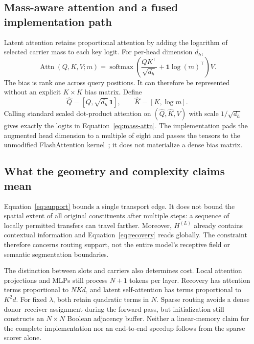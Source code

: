 \subsection{Mass-aware attention and a fused implementation path}

Latent attention retains proportional attention by adding the logarithm of
selected carrier mass to each key logit. For per-head dimension $d_h$,
\begin{equation}
 \operatorname{Attn}(Q,K,V;m)=
 \operatorname{softmax}\!\left(\frac{QK^\top}{\sqrt {d_h}}
 +\mathbf 1\log(m)^\top\right)V.
 \label{eq:mass-attn}
\end{equation}
The bias is rank one across query positions. It can therefore be represented
without an explicit $K\times K$ bias matrix. Define
\begin{equation}
\widehat Q=[Q,\sqrt {d_h}\,\mathbf 1],\qquad
 \widehat K=[K,\log m].
\end{equation}
Calling standard scaled dot-product attention on $(\widehat Q,\widehat K,V)$
with scale $1/\sqrt {d_h}$ gives exactly the logits in
Equation~\eqref{eq:mass-attn}. The implementation pads the augmented head
dimension to a multiple of eight and passes the tensors to the unmodified
FlashAttention kernel~\cite{flashattn2022}; it does not materialize a dense
bias matrix.

\subsection{What the geometry and complexity claims mean}

Equation~\eqref{eq:support} bounds a single transport edge. It does not bound
the spatial extent of all original constituents after multiple steps: a
sequence of locally permitted transfers can travel farther. Moreover,
$H^{(L)}$ already contains contextual information and
Equation~\eqref{eq:recovery} reads globally. The constraint therefore concerns
routing support, not the entire model's receptive field or semantic
segmentation boundaries.

The distinction between slots and carriers also determines cost. Local
attention projections and MLPs still process $N+1$ tokens per layer.
Recovery has attention terms proportional to $NKd$, and latent self-attention
has terms proportional to $K^2d$. For fixed $\lambda$, both retain quadratic
terms in $N$. Sparse routing avoids a dense donor--receiver assignment during
the forward pass, but initialization still constructs an $N\times N$
Boolean adjacency buffer. Neither a linear-memory claim for the complete
implementation nor an end-to-end speedup follows from the sparse scorer alone.


